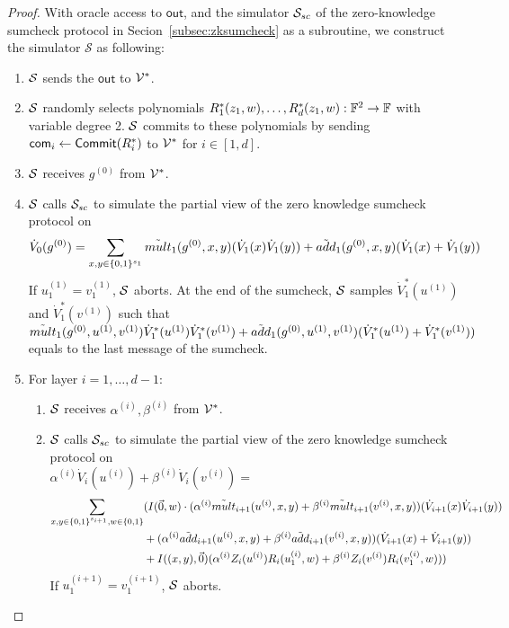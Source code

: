 \begin{proof} With oracle access to $\mathsf{out}$, and the simulator $\S_{sc}$ of the zero-knowledge sumcheck protocol in Secion~\ref{subsec:zksumcheck} as a subroutine, we construct the simulator $\mathcal{S}$ as following:

\begin{enumerate}

\item $\S$ sends the $\mathsf{out}$ to $\V^*$.

\item $\S$ randomly selects polynomials $R^*_1(z_1, w), \ldots, R^*_d(z_1, w): \F^2\rightarrow \F$ with variable degree 2. $\S$ commits to these polynomials by sending $\comm_i\leftarrow\Commit(R^*_i)$ to $\V^*$ for $i\in[1,d]$.

\item $\S$ receives $g^{(0)}$ from $\V^*$.

\item $\S$ calls $\S_{sc}$ to simulate the partial view of the zero knowledge sumcheck protocol on 
\[
\dot{V}_{0}(g^{(0)})=\sum_{x, y\in \binary^{s_{1}}}\tilde{mult}_{1}(g^{(0)}, x, y)(\dot{V}_{1}(x)\dot{V}_{1}(y))+\tilde{add}_{1}(g^{(0)},x,y)(\dot{V}_{1}(x)+\dot{V}_{1}(y))
\]
If $u_1^{(1)} = v_1^{(1)}$, $\S$ aborts. At the end of the sumcheck, $\S$ samples $\dot{V}^*_1(u^{(1)})$ and $\dot{V}^*_1(v^{(1)})$ such that $\tmult_1(g^{(0)},u^{(1)},v^{(1)})\dot{V}^*_1(u^{(1)})\dot{V}^*_1(v^{(1)})+\tadd_1(g^{(0)},u^{(1)},v^{(1)})(\dot{V}^*_1(u^{(1)})+\dot{V}^*_1(v^{(1)}))$ equals to the last message of the sumcheck.

\item For layer $i=1,\ldots,d-1$:
	\begin{enumerate}
	\item $\S$ receives $\alpha^{(i)}, \beta^{(i)}$ from $\V^*$.
	\item $\S$ calls $\S_{sc}$ to simulate the partial view of the zero knowledge sumcheck protocol on \\
	
	$\alpha^{(i)}\dot{V}_i(u^{(i)})+\beta^{(i)}\dot{V}_i(v^{(i)})=$
	\begin{align*}
	\sum_{x, y\in \binary^{s_{i+1}},w \in \binary}&(I(\vec{0},w) \cdot (\alpha^{(i)}\tilde{mult}_{i+1}(u^{(i)}, x, y)+\beta^{(i)}\tilde{mult}_{i+1}(v^{(i)}, x, y))(\dot{V}_{i+1}(x)\dot{V}_{i+1}(y))\\
	&+(\alpha^{(i)}\tilde{add}_{i+1}(u^{(i)}, x, y)+\beta^{(i)}\tilde{add}_{i+1}(v^{(i)}, x, y))(\dot{V}_{i+1}(x)+\dot{V}_{i+1}(y))\nonumber\\
	&+ I((x, y), \vec{0})(\alpha^{(i)}Z_i(u^{(i)})R_i(u_1^{(i)}, w)+\beta^{(i)}Z_i(v^{(i)})R_i(v_1^{(i)}, w)))
	\end{align*}
	If $u_1^{(i+1)} = v_1^{(i+1)}$, $\S$ aborts.
	

\end{enumerate}
\end{enumerate}
\end{proof}
